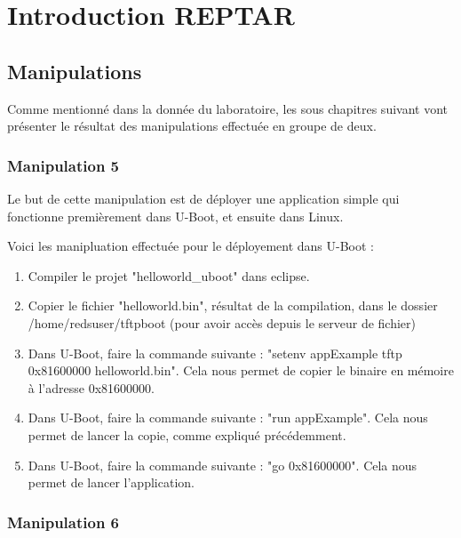 
\chapter{Introduction REPTAR} %

\label{Chapitre 2} %


\section{Manipulations}

Comme mentionné dans la donnée du laboratoire, les sous chapitres suivant vont présenter le résultat des manipulations effectuée en groupe de deux.

\subsection{Manipulation 5}
Le but de cette manipulation est de déployer une application simple qui fonctionne premièrement dans U-Boot, et ensuite dans Linux.

Voici les manipluation effectuée pour le déployement dans U-Boot :
\begin{enumerate}
\item Compiler le projet "helloworld\_uboot" dans eclipse.
\item Copier le fichier "helloworld.bin", résultat de la compilation, dans le dossier /home/redsuser/tftpboot (pour avoir accès depuis le serveur de fichier)
\item Dans U-Boot, faire la commande suivante : "setenv appExample tftp 0x81600000 helloworld.bin". Cela nous permet de copier le binaire en mémoire à l'adresse 0x81600000.
\item Dans U-Boot, faire la commande suivante : "run appExample". Cela nous permet de lancer la copie, comme expliqué précédemment.
\item Dans U-Boot, faire la commande suivante : "go 0x81600000". Cela nous permet de lancer l'application.
\end{enumerate}


\subsection{Manipulation 6}

